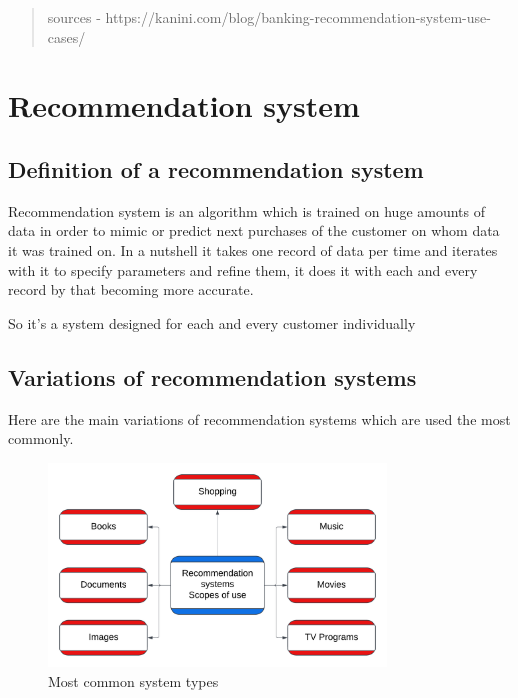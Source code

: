 \documentclass[10pt,twoside,english,a4paper]{article}
\begin{document}
\begin{abstract}
\begin{itemize}
\begin{itemize}
    \end{itemize}
    

\end{itemize}

sources - https://kanini.com/blog/banking-recommendation-system-use-cases/

\end{abstract}


\tableofcontents

\section{Recommendation system}

\subsection{Definition of a recommendation system}
Recommendation system is an algorithm which is trained on huge amounts of data in order to mimic or predict next purchases of the customer on whom data it was trained on.
In a nutshell it takes one record of data per time and iterates with it to specify parameters and refine them, it does it with each and every record by that becoming more accurate.

So it's a system designed for each and every customer individually

\subsection{Variations of recommendation systems}
Here are the main variations of recommendation systems which are used the most commonly.

\begin{figure}[h]
\centering
\includegraphics[width=0.8\textwidth]{system_types}
\caption{Most common system types}
\label{fig:Types}
\end{figure}
\end{document}
